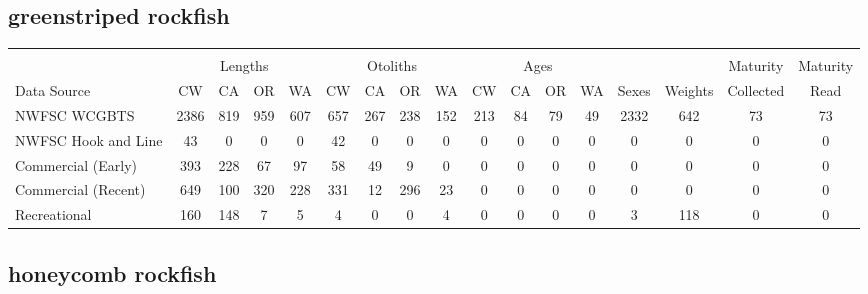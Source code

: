 \documentclass[12pt,]{article}
\begin{document}
\FloatBarrier  

\subsection{greenstriped rockfish}\label{greenstriped-rockfish}

\begin{table}[ht]
\centering
\begingroup\fontsize{10pt}{10pt}\selectfont
\begin{tabular}{|l|cccc|cccc|cccc|c|c|c|c|}
  \hline
 &  &  &  &  &  &  &  &  &  &  &  &  &  &  &  &  \\ 
   & \multicolumn{4}{c}{Lengths} &  \multicolumn{4}{c}{Otoliths} & \multicolumn{4}{c}{Ages} &  & & Maturity & Maturity\\
 Data Source & CW & CA & OR & WA & CW & CA & OR & WA & CW & CA & OR & WA & Sexes & Weights & Collected & Read\\
 \hline
NWFSC WCGBTS & 2386 & 819 & 959 & 607 & 657 & 267 & 238 & 152 & 213 & 84 & 79 & 49 & 2332 & 642 & 73 & 73 \\ 
  NWFSC Hook and Line & 43 & 0 & 0 & 0 & 42 & 0 & 0 & 0 & 0 & 0 & 0 & 0 & 0 & 0 & 0 & 0 \\ 
  Commercial (Early) & 393 & 228 & 67 & 97 & 58 & 49 & 9 & 0 & 0 & 0 & 0 & 0 & 0 & 0 & 0 & 0 \\ 
  Commercial (Recent) & 649 & 100 & 320 & 228 & 331 & 12 & 296 & 23 & 0 & 0 & 0 & 0 & 0 & 0 & 0 & 0 \\ 
  Recreational & 160 & 148 & 7 & 5 & 4 & 0 & 0 & 4 & 0 & 0 & 0 & 0 & 3 & 118 & 0 & 0 \\ 
   \hline
\end{tabular}
\endgroup
\end{table}

\FloatBarrier  

\subsection{honeycomb rockfish}\label{honeycomb-rockfish}
\end{document}
